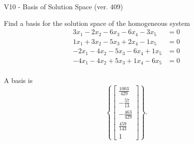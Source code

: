 \begin{exercise}
  \begin{exerciseTitle}V10 - Basis of Solution Space (ver. 409)\end{exerciseTitle}
  \begin{exerciseStatement}
    Find a basis for the solution space of the homogeneous system 
\begin{align*}
 3 x_ 1 -2 x_ 2 -6 x_ 3 -6 x_ 4 -3 x_ 5 &= 0  \\ 
  1 x_ 1 + 3 x_ 2 -5 x_ 3 + 2 x_ 4 -1 x_ 5 &= 0  \\ 
  -2 x_ 1 -4 x_ 2 -5 x_ 3 -6 x_ 4 + 1 x_ 5 &= 0  \\ 
  -4 x_ 1 -4 x_ 2 + 5 x_ 3 + 1 x_ 4 -6 x_ 5 &= 0  \\ 
 \end{align*}


 
  \end{exerciseStatement}

  \begin{exerciseAnswer}
   A basis is   
\[\left\{\left[\begin{array}{c}
\frac{1003}{429} \\
-\frac{57}{13} \\
-\frac{463}{429} \\
\frac{459}{143} \\
1
\end{array}\right]\right\}.\]

  


  \end{exerciseAnswer}
\end{exercise}